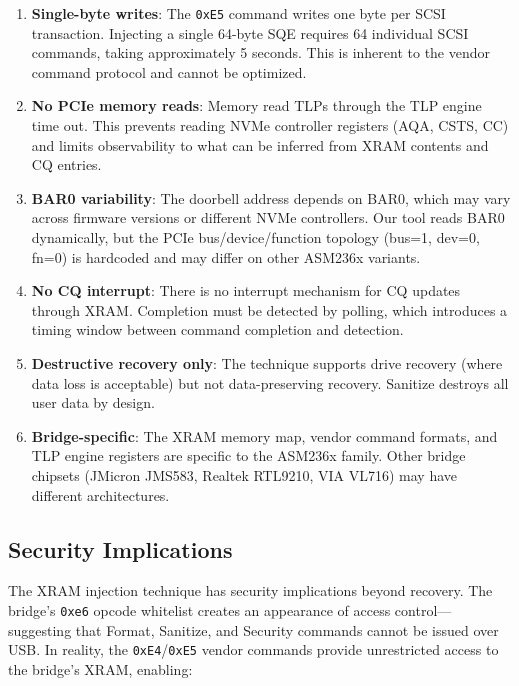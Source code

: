 \documentclass[conference]{IEEEtran}
\begin{document}
\begin{enumerate}
\item \textbf{Single-byte writes}: The \texttt{0xE5} command writes one
  byte per SCSI transaction. Injecting a single 64-byte SQE requires 64
  individual SCSI commands, taking approximately 5 seconds. This is
  inherent to the vendor command protocol and cannot be optimized.

\item \textbf{No PCIe memory reads}: Memory read TLPs through the TLP
  engine time out. This prevents reading NVMe controller registers
  (AQA, CSTS, CC) and limits observability to what can be inferred
  from XRAM contents and CQ entries.

\item \textbf{BAR0 variability}: The doorbell address depends on BAR0,
  which may vary across firmware versions or different NVMe controllers.
  Our tool reads BAR0 dynamically, but the PCIe bus/device/function
  topology (bus=1, dev=0, fn=0) is hardcoded and may differ on other
  ASM236x variants.

\item \textbf{No CQ interrupt}: There is no interrupt mechanism for CQ
  updates through XRAM. Completion must be detected by polling, which
  introduces a timing window between command completion and detection.

\item \textbf{Destructive recovery only}: The technique supports drive
  recovery (where data loss is acceptable) but not data-preserving
  recovery. Sanitize destroys all user data by design.

\item \textbf{Bridge-specific}: The XRAM memory map, vendor command
  formats, and TLP engine registers are specific to the ASM236x family.
  Other bridge chipsets (JMicron JMS583, Realtek RTL9210, VIA VL716)
  may have different architectures.
\end{enumerate}


\subsection{Security Implications}
\label{sec:security}

The XRAM injection technique has security implications beyond recovery.
The bridge's \texttt{0xe6} opcode whitelist creates an appearance of
access control---suggesting that Format, Sanitize, and Security commands
cannot be issued over USB. In reality, the \texttt{0xE4}/\texttt{0xE5}
vendor commands provide unrestricted access to the bridge's XRAM,
enabling:
\end{document}
